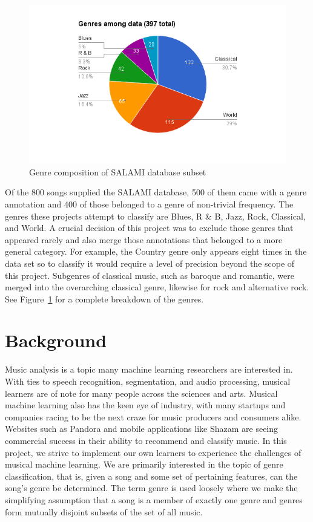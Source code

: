 \documentclass[11pt, twocolumn]{article}
\begin{document}
\begin{figure}
  \centering
  \includegraphics[width=\linewidth]{resources/chart.png}
  \caption{Genre composition of SALAMI database subset}
  \label{fig:chart}
\end{figure}

    Of the 800 songs supplied the SALAMI database, 500 of them came with a
genre  annotation and 400 of those belonged to a genre of non-trivial
frequency. The genres these projects attempt to classify are Blues, R \& B,
Jazz, Rock, Classical, and World. A crucial decision of this project was to
exclude those genres that appeared rarely and also merge those annotations that
belonged to a more general category. For example, the Country genre only
appears eight times in the data set so to classify it would require a level of
precision beyond the scope of this project. Subgenres of classical music, such
as baroque and romantic, were merged into the overarching classical genre,
likewise for rock and alternative rock. See Figure~\ref{fig:chart} for a
complete breakdown of the genres.

\section{Background}
    Music analysis is a topic many machine learning researchers are interested
in. With ties to speech recognition, segmentation, and audio processing,
musical learners are of note for many people across the sciences and arts.
Musical machine learning also has the keen eye of industry, with many startups
and companies racing to be the next craze for music producers and consumers
alike. Websites such as Pandora and mobile applications like Shazam are seeing
commercial success in their ability to recommend and classify music. In this
project, we strive to implement our own learners to experience the challenges
of musical machine learning. We are primarily interested in the topic of genre
classification, that is, given a song and some set of pertaining features, can
the song’s genre be determined. The term genre is used loosely where we make
the simplifying assumption that a song is a member of exactly one genre and
genres form mutually disjoint subsets of the set of all music.
\end{document}
